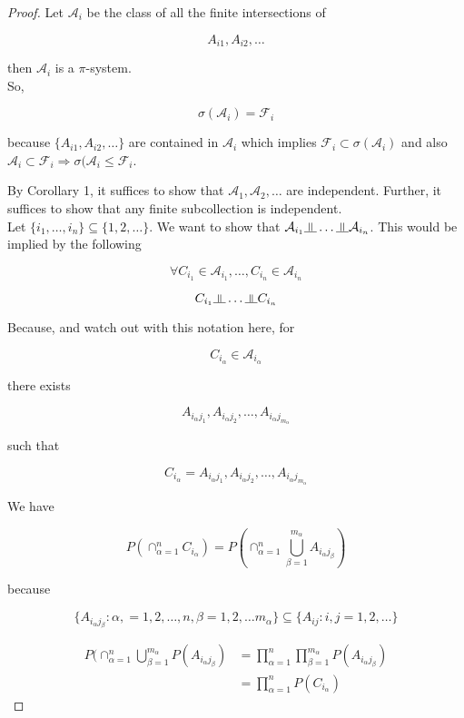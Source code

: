 \documentclass[11pt,fleqn]{book} %
\newcommand{\indep}{\rotatebox[origin=c]{90}{$\models$}}
\begin{document}
\begin{proof}
	Let $\mathcal{A}_i$ be the class of all the finite intersections of 

	$$A_{i1}, A_{i2}, \dots$$

	then $\mathcal{A}_i$ is a $\pi$-system. \\

	So, 

	$$\sigma(\mathcal{A}_i) = \mathcal{F}_i $$

	because $\{A_{i1}, A_{i2}, \dots \}$ are contained in $\mathcal{A}_i$ which implies $\mathcal{F}_i \subset \sigma(\mathcal{A}_i)$ and also $\mathcal{A}_i \subset \mathcal{F}_i \Rightarrow \sigma(\mathcal{A}_i \leq \mathcal{F}_i$.

	By Corollary 1, it suffices to show that $\mathcal{A}_1, \mathcal{A}_2, \dots$ are independent. Further, it suffices to show that any finite subcollection is independent.\\

	Let $\{i_1, \dots, i_n \} \subseteq \{1, 2, \dots \}$. We want to show that $\mathcal{A}_{i_1}\indep \dots \indep \mathcal{A}_{i_n}$. This would be implied by the following

	$$\forall C_{i_1} \in \mathcal{A}_{i_1}, \dots, C_{i_n} \in \mathcal{A}_{i_n} $$

	$$C_{i_1} \indep \dots \indep C_{i_n}$$

	Because, and watch out with this notation here, for

			$$C_{i_\alpha} \in \mathcal{A}_{i_\alpha} $$

		there exists

		$${A}_{i_\alpha j_1}, {A}_{i_\alpha j_2}, \dots, {A}_{i_\alpha j_{m_\alpha}} $$

		such that

		$$C_{i_\alpha} = {A}_{i_\alpha j_1}, {A}_{i_\alpha j_2}, \dots, {A}_{i_\alpha j_{m_\alpha}} $$

		We have

		$$ P(\cap^n_{\alpha = 1} C_{i_\alpha}) = P(\cap^n_{\alpha = 1} \bigcup^{m_\alpha}_{\beta = 1} A_{i_\alpha j_\beta})$$

		because 

		$$\{A_{i_\alpha j_\beta}: \alpha, = 1, 2, \dots, n , \beta = 1, 2, \dots m_\alpha\} \subseteq \{ A_{ij}: i, j = 1, 2, \dots\}$$

		\begin{align*}
			P(\cap^n_{\alpha = 1} \bigcup^{m_\alpha}_{\beta = 1} P(A_{i_\alpha j_\beta}) &= \displaystyle \prod^n_{\alpha = 1} \prod^{m_\alpha}_{\beta = 1} P(A_{i_\alpha j_\beta})\\
			&= \displaystyle \prod^n_{\alpha = 1} P(C_{i_\alpha})
		\end{align*}
\end{proof}
\end{document}
